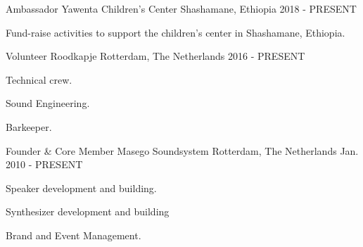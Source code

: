 

\begin{cventries}

  \cventry
    {Ambassador} %
    {Yawenta Children's Center } %
    {Shashamane, Ethiopia} %
    {2018 - PRESENT} %
    {
      \begin{cvitems} %
        \item {Fund-raise activities to support the children's center in Shashamane, Ethiopia.}
      \end{cvitems}
    }
    
  \cventry
    {Volunteer} %
    {Roodkapje } %
    {Rotterdam, The Netherlands} %
    {2016 - PRESENT} %
    {
      \begin{cvitems} %
        \item {Technical crew.}
        \item {Sound Engineering.}
        \item {Barkeeper.}
      \end{cvitems}
    }

  \cventry
    {Founder \& Core Member} %
    {Masego Soundsystem} %
    {Rotterdam, The Netherlands} %
    {Jan. 2010 - PRESENT} %
    {
      \begin{cvitems} %
        \item {Speaker development and building.}
        \item {Synthesizer development and building}
        \item {Brand and Event Management.}
      \end{cvitems}
    }

\end{cventries}
